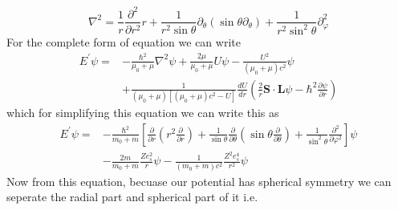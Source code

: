 \documentclass{article}
\begin{document}
\begin{equation}
   \nabla^{2}=\frac{1}{r} \frac{\partial^{2}}{\partial r^{2}} r + \frac{1}{r^{2} \sin \theta} \partial_{\theta}\left(\sin \theta \partial_{\theta}\right) + \frac{1}{r^{2} \sin ^{2} \theta} \partial_{\varphi}^{2}
\end{equation}
For the complete form of equation we can write 
\begin{equation}
\begin{aligned}
E^{\prime} \psi=&-\frac{\hbar^{2}}{\mu_{0}+\mu} \nabla^{2} \psi+\frac{2 \mu}{\mu_{0}+\mu} U \psi-\frac{U^{2}}{\left(\mu_{0}+\mu\right) c^{2}} \psi \\
&+\frac{1}{\left(\mu_{0}+\mu\right)\left[\left(\mu_{0}+\mu\right) c^{2}-U\right]} \frac{d U}{d r}\left(\frac{2}{r} \mathbf{S} \cdot \mathbf{L} \psi-\hbar^{2} \frac{\partial \psi}{\partial r}\right)
\end{aligned}
\end{equation}
which for simplifying this equation we can write this as 
\begin{equation}
\begin{aligned}
E^{\prime} \psi=&-\frac{\hbar^{2}}{m_{0}+m}\left[\frac{\partial}{\partial r}\left(r^{2} \frac{\partial}{\partial r}\right)+\frac{1}{\sin \theta} \frac{\partial}{\partial \theta}\left(\sin \theta \frac{\partial}{\partial \theta}\right)+\frac{1}{\sin ^{2} \theta} \frac{\partial^{2}}{\partial \varphi^{2}}\right] \psi \\
&-\frac{2 m}{m_{0}+m} \frac{Z e_{s}^{2}}{r} \psi-\frac{1}{\left(m_{0}+m\right) c^{2}} \frac{Z^{2} e_{s}^{4}}{r^{2}} \psi
\end{aligned}
\end{equation}
Now from this equation, becuase our potential has spherical symmetry we can seperate the radial part and spherical part of it i.e.
\end{document}
